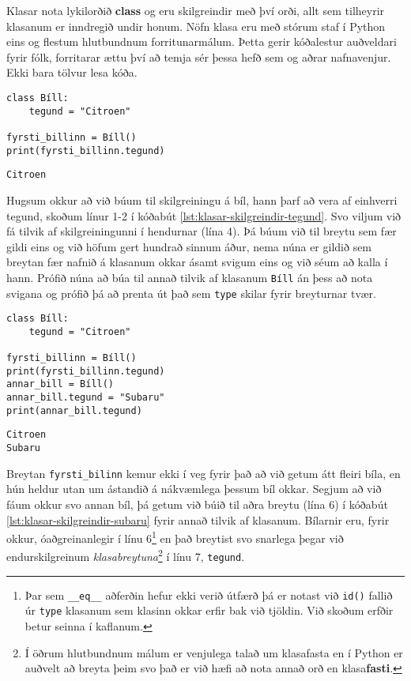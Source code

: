 Klasar nota lykilorðið \textbf{class} og eru skilgreindir með því orði, allt sem tilheyrir klasanum er inndregið undir honum.
Nöfn klasa eru með stórum staf í Python eins og flestum hlutbundnum forritunarmálum.
Þetta gerir kóðalestur auðveldari fyrir fólk, forritarar ættu því að temja sér þessa hefð sem og aðrar nafnavenjur.
Ekki bara tölvur lesa kóða.

\begin{lstlisting}[caption=Klasinn Bíll skilgreindur, label=lst:klasar-skilgreindir-tegund]
class Bíll:
	tegund = "Citroen"

fyrsti_billinn = Bíll()
print(fyrsti_billinn.tegund)
\end{lstlisting}
\lstset{style=uttak}
\begin{lstlisting}
Citroen
\end{lstlisting}
\lstset{style=venjulegt}

Hugsum okkur að við búum til skilgreiningu á bíl, hann þarf að vera af einhverri tegund, skoðum línur 1-2 í kóðabút \ref{lst:klasar-skilgreindir-tegund}.
Svo viljum við fá tilvik af skilgreiningunni í hendurnar (lína 4).
Þá búum við til breytu sem fær gildi eins og við höfum gert hundrað sinnum áður, nema núna er gildið sem breytan fær nafnið á klasanum okkar ásamt svigum eins og við séum að kalla í hann.
Prófið núna að búa til annað tilvik af klasanum \texttt{Bíll} án þess að nota svigana og prófið þá að prenta út það sem \texttt{type} skilar fyrir breyturnar tvær.

\begin{lstlisting}[caption=Klasinn Bíll skilgreindur og tvö tilvik búin til, label=lst:klasar-skilgreindir-subaru]
class Bíll:
	tegund = "Citroen"
	
fyrsti_billinn = Bíll()
print(fyrsti_billinn.tegund)
annar_bill = Bíll()
annar_bill.tegund = "Subaru"
print(annar_bill.tegund)
\end{lstlisting}
\lstset{style=uttak}
\begin{lstlisting}
Citroen
Subaru
\end{lstlisting}
\lstset{style=venjulegt}

Breytan \texttt{fyrsti\_bilinn} kemur ekki í veg fyrir það að við getum átt fleiri bíla, en hún heldur utan um ástandið á nákvæmlega þessum bíl okkar.
Segjum að við fáum okkur svo annan bíl, þá getum við búið til aðra breytu (lína 6) í kóðabút \ref{lst:klasar-skilgreindir-subaru} fyrir annað tilvik af klasanum.
Bílarnir eru, fyrir okkur, óaðgreinanlegir í línu 6\footnote{Þar sem \texttt{\_\_eq\_\_} aðferðin hefur ekki verið útfærð þá er notast við \texttt{id()} fallið úr \texttt{type} klasanum sem klasinn okkar erfir bak við tjöldin.
Við skoðum erfðir betur seinna í kaflanum.} en það breytist svo snarlega þegar við endurskilgreinum \emph{klasabreytuna}\footnote{Í öðrum hlutbundnum málum er venjulega talað um klasafasta en í Python er auðvelt að breyta þeim svo það er við hæfi að nota annað orð en klasa\textbf{fasti}.} í línu 7, \texttt{tegund}.

